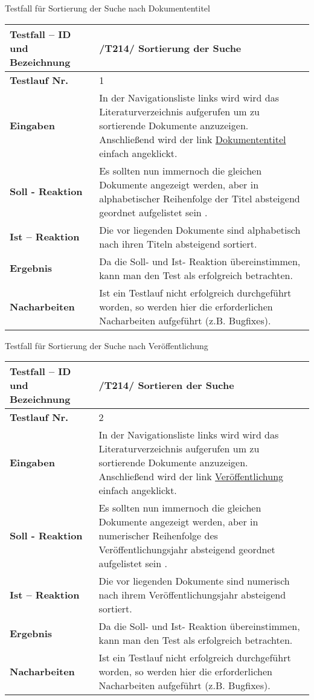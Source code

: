 Testfall für Sortierung der Suche nach Dokumententitel\\
\begin{longtable}{|p{5cm}|p{10cm}|}
\hline
\textbf{Testfall -- ID und Bezeichnung} & \textnormal{/T214/ Sortierung der Suche} \\
\hline
\textbf{Testlauf Nr.} & \textnormal{1} \\
\hline
\textbf{Eingaben} & \textnormal{In der Navigationsliste links wird wird das Literaturverzeichnis aufgerufen um zu sortierende Dokumente anzuzeigen. Anschließend wird der link \uline{Dokumententitel} einfach angeklickt.} \\
\hline
\textbf{Soll - Reaktion} & \textnormal{Es sollten nun immernoch die gleichen Dokumente angezeigt werden, aber in alphabetischer Reihenfolge der Titel absteigend geordnet aufgelistet sein .} \\
\hline
\textbf{Ist -- Reaktion} & \textnormal{Die vor liegenden Dokumente sind alphabetisch nach ihren Titeln absteigend sortiert.} \\
\hline
\textbf{Ergebnis} & \textnormal{Da die Soll- und Ist- Reaktion übereinstimmen, kann man den Test als erfolgreich betrachten.} \\
\hline
\textbf{Nacharbeiten } & \textnormal{Ist ein Testlauf nicht erfolgreich
durchgef\"uhrt worden, so werden hier die erforderlichen Nacharbeiten aufgef\"uhrt
(z.B. Bugfixes).} \\
\hline
 \end{longtable}
Testfall für Sortierung der Suche nach Veröffentlichung\\ 
\begin{longtable}{|p{5cm}|p{10cm}|}
\hline
\textbf{Testfall -- ID und Bezeichnung} & \textnormal{/T214/ Sortieren der Suche} \\
\hline
\textbf{Testlauf Nr.} & \textnormal{2} \\
\hline
\textbf{Eingaben} & \textnormal{In der Navigationsliste links wird wird das Literaturverzeichnis aufgerufen um zu sortierende Dokumente anzuzeigen. Anschließend wird der link \uline{Veröffentlichung} einfach angeklickt.} \\
\hline
\textbf{Soll - Reaktion} & \textnormal{Es sollten nun immernoch die gleichen Dokumente angezeigt werden, aber in numerischer Reihenfolge des Veröffentlichungsjahr absteigend geordnet aufgelistet sein .} \\
\hline
\textbf{Ist -- Reaktion} & \textnormal{Die vor liegenden Dokumente sind numerisch nach ihrem Veröffentlichungsjahr absteigend sortiert.} \\
\hline
\textbf{Ergebnis} & \textnormal{Da die Soll- und Ist- Reaktion übereinstimmen, kann man den Test als erfolgreich betrachten.} \\
\hline
\textbf{Nacharbeiten } & \textnormal{Ist ein Testlauf nicht erfolgreich
durchgef\"uhrt worden, so werden hier die erforderlichen Nacharbeiten aufgef\"uhrt
(z.B. Bugfixes).} \\
\hline
 \end{longtable}
